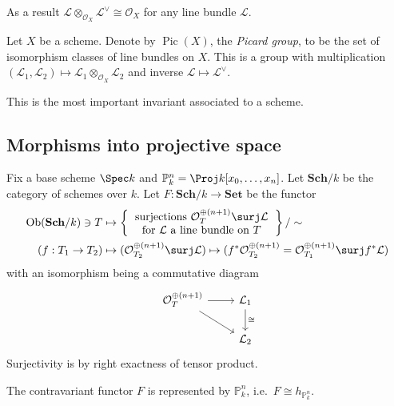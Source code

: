 \documentclass[a4paper]{article}
\renewcommand*{\P}{\mathbb{P}}
\renewcommand{\c}[1]{\mathbf{#1}} %
\newcommand{\sh}[1]{\mathcal{#1}} %
\DeclareMathOperator{\Pic}{Pic} %
\begin{document}
\begin{remark}
  As a result \(\sh L \otimes_{\sh O_X} \sh L^\vee \cong \sh O_X\) for any line bundle \(\sh L\).
\end{remark}

\begin{definition}
  Let \(X\) be a scheme. Denote by \(\Pic(X)\), the \emph{Picard group}, to be the set of isomorphism classes of line bundles on \(X\). This is a group with multiplication \((\sh L_1, \sh L_2) \mapsto \sh L_1 \otimes_{\sh O_X} \sh L_2\) and inverse \(\sh L \mapsto \sh L^\vee\).
\end{definition}

This is the most important invariant associated to a scheme.

\subsection{Morphisms into projective space}

Fix a base scheme \(\Spec k\) and \(\P_k^n = \Proj k[x_0, \dots, x_n]\). Let \(\c{Sch}/k\) be the category of schemes over \(k\). Let \(F: \c{Sch}/k \to \c{Set}\) be the functor
\begin{align*}
  \mathrm{Ob}(\c{Sch}/k) \ni T &\mapsto
                        \left\{
                        \begin{tabular}{c}
                          surjections \(\sh O_T^{\oplus(n + 1)} \surj \sh L\) \\
                          for \(\sh L\) a line bundle on \(T\)
                        \end{tabular}
  \right\}/\sim \\
  (f: T_1 \to T_2) &\mapsto (\sh O_{T_2}^{\oplus(n + 1)} \surj \sh L) \mapsto (f^* \sh O_{T_2}^{\oplus (n + 1)} = \sh O_{T_1}^{\oplus (n + 1)} \surj f^* \sh L)
\end{align*}
with an isomorphism being a commutative diagram
\[
  \begin{tikzcd}
    \sh O_T^{\oplus(n + 1)} \ar[r] \ar[dr] & \sh L_1 \ar[d, "\cong"] \\
    & \sh L_2
  \end{tikzcd}
\]
Surjectivity is by right exactness of tensor product.

\begin{theorem}
  The contravariant functor \(F\) is represented by \(\P_k^n\), i.e.\ \(F \cong h_{\P^n_k}\).
\end{theorem}
\end{document}
